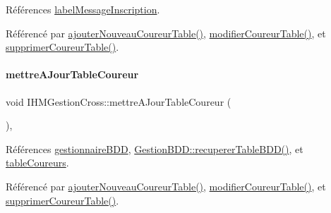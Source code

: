 Références \hyperlink{class_i_h_m_gestion_cross_a1855bd63290c39c20660064b41710e8c}{label\+Message\+Inscription}.



Référencé par \hyperlink{class_i_h_m_gestion_cross_aa3e6f06ff2f4e724e2f0688528bcf386}{ajouter\+Nouveau\+Coureur\+Table()}, \hyperlink{class_i_h_m_gestion_cross_a3a969f85f31f25ed6df6a75a1cee2de1}{modifier\+Coureur\+Table()}, et \hyperlink{class_i_h_m_gestion_cross_af13fabb9831fcd237c9c1e7ee75c47b8}{supprimer\+Coureur\+Table()}.


\mbox{\label{class_i_h_m_gestion_cross_a53c84315d723d75ad7b4a7d4c317efc5}} 
\paragraph{\texorpdfstring{mettre\+A\+Jour\+Table\+Coureur}{mettreAJourTableCoureur}}
{\footnotesize\ttfamily void I\+H\+M\+Gestion\+Cross\+::mettre\+A\+Jour\+Table\+Coureur (\begin{DoxyParamCaption}{ }\end{DoxyParamCaption})\hspace{0.3cm}{\ttfamily [private]}, {\ttfamily [slot]}}



Références \hyperlink{class_i_h_m_gestion_cross_a440bac63a3e51db3e2c08e883f8cafc9}{gestionnaire\+B\+DD}, \hyperlink{class_gestion_b_d_d_a2b44ebc5bf5b1a7babde6512817a85b4}{Gestion\+B\+D\+D\+::recuperer\+Table\+B\+D\+D()}, et \hyperlink{class_i_h_m_gestion_cross_a9bf93b48403da7bf152f013055152630}{table\+Coureurs}.



Référencé par \hyperlink{class_i_h_m_gestion_cross_aa3e6f06ff2f4e724e2f0688528bcf386}{ajouter\+Nouveau\+Coureur\+Table()}, \hyperlink{class_i_h_m_gestion_cross_a3a969f85f31f25ed6df6a75a1cee2de1}{modifier\+Coureur\+Table()}, et \hyperlink{class_i_h_m_gestion_cross_af13fabb9831fcd237c9c1e7ee75c47b8}{supprimer\+Coureur\+Table()}.


